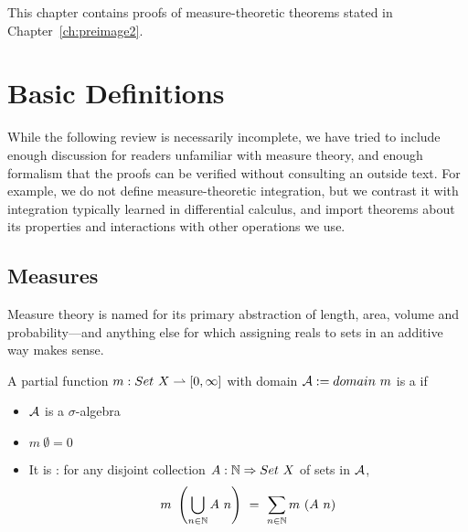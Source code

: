 
\begin{comment}
Jay: Ch 10 doesn't give a big enough clue how you are going to get back to
your dissertation. For most of it, it feels like a background review.
Similarly, it needs to end with something like, "Therefore this big
result from Ch 8 is satisfied and that's good for the big picture this
way." You want someone to be able to read your dissertation and if
this is a chapter (and not an appendix) then it needs to be readable.
\end{comment}


This chapter contains proofs of measure-theoretic theorems stated in Chapter~\ref{ch:preimage2}.

\section{Basic Definitions}

While the following review is necessarily incomplete, we have tried to include enough discussion for readers unfamiliar with measure theory, and enough formalism that the proofs can be verified without consulting an outside text.
For example, we do not define measure-theoretic integration, but we contrast it with integration typically learned in differential calculus, and import theorems about its properties and interactions with other operations we use.

\subsection{Measures}

Measure theory is named for its primary abstraction of length, area, volume and probability---and anything else for which assigning reals to sets in an additive way makes sense.

\begin{definition}[measure]
\label{def:measure}
A partial function $m : Set~X \rightharpoonup [0,\infty]$ with domain $\mathcal{A} := domain~m$ is a  if
\begin{itemize}
	\item $\mathcal{A}$ is a $\sigma$-algebra
	\item $m~\emptyset = 0$
	\item It is : for any disjoint collection $A : \mathbb{N} \Rightarrow Set~X$ of sets in $\mathcal{A}$,
	\begin{equation}
		m~\left(\bigcup_{n \in \Nat} A~n\right)\ =\ \sum_{n \in \Nat} m~(A~n)
	\end{equation}
\end{itemize}
\end{definition}

